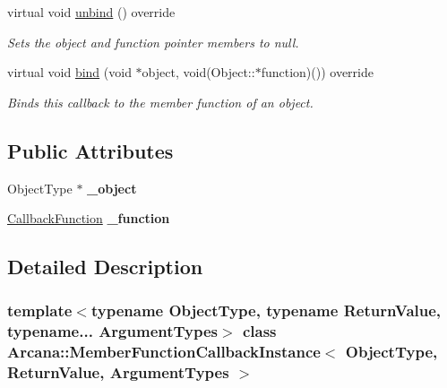 \begin{DoxyCompactItemize}
virtual void \mbox{\hyperlink{class_arcana_1_1_member_function_callback_instance_a9cafc44cbe8d2df52ca94d516f9809ba}{unbind}} () override
\begin{DoxyCompactList}\small\item\em Sets the object and function pointer members to null. \end{DoxyCompactList}\item 
virtual void \mbox{\hyperlink{class_arcana_1_1_member_function_callback_instance_ae93ba2e166f268d480431bb7dfd00140}{bind}} (void $\ast$object, void(Object\+::$\ast$function)()) override
\begin{DoxyCompactList}\small\item\em Binds this callback to the member function of an object. \end{DoxyCompactList}\end{DoxyCompactItemize}
\subsection*{Public Attributes}
\begin{DoxyCompactItemize}
\item 
\mbox{\label{class_arcana_1_1_member_function_callback_instance_a2ec153b43407b049f27d012df6d8c4f4}} 
Object\+Type $\ast$ {\bfseries \+\_\+object}
\item 
\mbox{\label{class_arcana_1_1_member_function_callback_instance_a4eb431b612dddd4e03da01e57894bbb2}} 
\mbox{\hyperlink{class_arcana_1_1_member_function_callback_instance_ad7ba7b4937f6301718e8dffb89068f20}{Callback\+Function}} {\bfseries \+\_\+function}
\end{DoxyCompactItemize}


\subsection{Detailed Description}
\subsubsection*{template$<$typename Object\+Type, typename Return\+Value, typename... Argument\+Types$>$\newline
class Arcana\+::\+Member\+Function\+Callback\+Instance$<$ Object\+Type, Return\+Value, Argument\+Types $>$}

